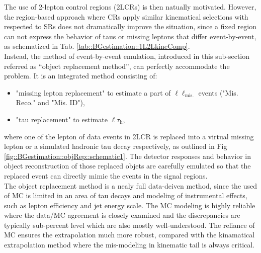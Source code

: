 The use of 2-lepton control regions (2LCRs) is then natually motivated. However, the region-based approach where CRs apply similar kinematical selections with respected to SRs does not dramatically improve the situation, since a fixed region can not express the behavior of taus or missing leptons that differ event-by-event, as schematized in Tab. \ref{tab::BGestimation::1L2LkineComp}. \\

Instead, the method of event-by-event emulation, introduced in this sub-section referred as ``object replacement method'', can perfectly accommodate the problem. 
It is an integrated method consisting of:
\begin{itemize}
\item "missing lepton replacement" to estimate a part of $\ell\ell_{\mathrm{mis.}}$ events ("Mis. Reco." and "Mis. ID"),
\item "tau replacement" to estimate $\ell\tau_{\mathrm{h}}$,
\end{itemize}
where one of the lepton of data events in 2LCR is replaced into a virtual missing lepton or a simulated hadronic tau decay respectively, as outlined in Fig \ref{fig::BGestimation::objRep::schematic1}. 
The detector responses and behavior in object reconstruction of those replaced objets are carefully emulated so that the replaced event can directly mimic the events in the signal regions.   \\


The object replacement method is a nealy full data-deiven method, since the used of MC is limited in an area of tau decays and modeling of instrumental effects, such as lepton efficiency and jet energy scale.
The MC modeling is highly reliable where the data/MC agreement is closely examined and the discrepancies are typically sub-percent level which are also mostly well-understood. 
The reliance of MC ensures the extrapolation much more robust, compared with the kinamatical extrapolation method where the mis-modeling in kinematic tail is always critical. \\


